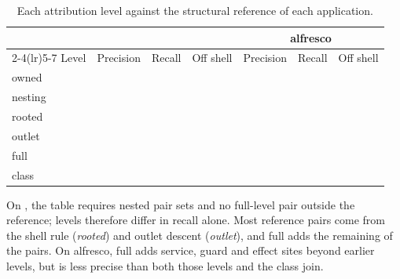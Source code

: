 \begin{table}[t]\footnotesize
\caption{Each attribution level against the structural reference of each application.}
\label{tab:groundtruth}
\begin{tabular}{@{}lrrrrrr@{}}
\toprule
 & \multicolumn{3}{c}{\GTApp{}} & \multicolumn{3}{c}{alfresco} \\
\cmidrule(lr){2-4}\cmidrule(lr){5-7}
Level & Precision & Recall & Off shell & Precision & Recall & Off shell \\
\midrule
owned & \GTOwnedPrecision{} & \GTOwnedRecall{} & \GTOwnedRecallNonShell{} & \GTAlfOwnedPrecision{} & \GTAlfOwnedRecall{} & \GTAlfOwnedRecallNonShell{} \\
nesting & \GTNestingPrecision{} & \GTNestingRecall{} & \GTNestingRecallNonShell{} & \GTAlfNestingPrecision{} & \GTAlfNestingRecall{} & \GTAlfNestingRecallNonShell{} \\
rooted & \GTRootedPrecision{} & \GTRootedRecall{} & \GTRootedRecallNonShell{} & \GTAlfRootedPrecision{} & \GTAlfRootedRecall{} & \GTAlfRootedRecallNonShell{} \\
outlet & \GTOutletPrecision{} & \GTOutletRecall{} & \GTOutletRecallNonShell{} & \GTAlfOutletPrecision{} & \GTAlfOutletRecall{} & \GTAlfOutletRecallNonShell{} \\
full & \GTFullPrecision{} & \GTFullRecall{} & \GTFullRecallNonShell{} & \GTAlfFullPrecision{} & \GTAlfFullRecall{} & \GTAlfFullRecallNonShell{} \\
class & \GTClassPrecision{} & \GTClassRecall{} & \GTClassRecallNonShell{} & \GTAlfClassPrecision{} & \GTAlfClassRecall{} & \GTAlfClassRecallNonShell{} \\
\bottomrule
\end{tabular}
\par{}
\end{table}

On \GTApp{}, the table requires nested pair sets and no full-level pair outside the reference;
levels therefore differ in recall alone. Most reference pairs come from the shell rule
(\emph{rooted}) and outlet descent (\emph{outlet}), and full adds the remaining
\GTOutletMissing{} of the \GTPairs{} pairs. On alfresco, full adds service, guard and effect sites beyond earlier
levels, but is less precise than both those levels and the class join.

